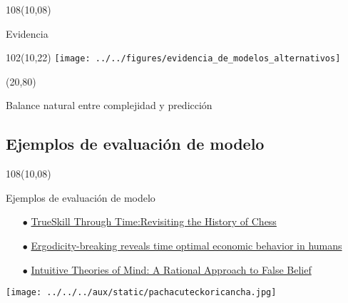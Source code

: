 \documentclass[shownotes]{beamer}
\begin{document}
\begin{frame}
\begin{textblock}{108}(10,08)
 \begin{center}
  \Large  Evidencia
 \end{center}
\end{textblock}


 \begin{textblock}{102}(10,22)
  \centering
  \texttt{[image: ../../figures/evidencia\_de\_modelos\_alternativos]} 
 \end{textblock} 
 
 
 \begin{textblock}{88}(20,80)
  \begin{mdframed}[backgroundcolor=black!15]
\centering
  Balance natural entre complejidad y predicci\'on
  \end{mdframed}
 \end{textblock}
\end{frame}

\subsection{Ejemplos de evaluaci\'on de modelo}
\begin{frame}
\begin{textblock}{108}(10,08)
 \begin{center}
  \large Ejemplos de evaluaci\'on de modelo
 \end{center}
\end{textblock}
 
\begin{itemize}
 \item[$\bullet$] \href{https://papers.nips.cc/paper/3331-trueskill-through-time-revisiting-the-history-of-chess.pdf}{TrueSkill Through Time:Revisiting the History of Chess} \pause
 \item[$\bullet$] \href{https://arxiv.org/pdf/1906.04652.pdf}{Ergodicity-breaking reveals time optimal economic behavior in humans} \pause
 \item[$\bullet$] \href{https://web.mit.edu/cocosci/Papers/pos785-goodman.pdf}{Intuitive Theories of Mind: A Rational Approach to False Belief}
\end{itemize}
 
\end{frame}










\begin{frame}[plain]

\centering
  \texttt{[image: ../../../aux/static/pachacuteckoricancha.jpg]}
\end{frame}
\end{document}
